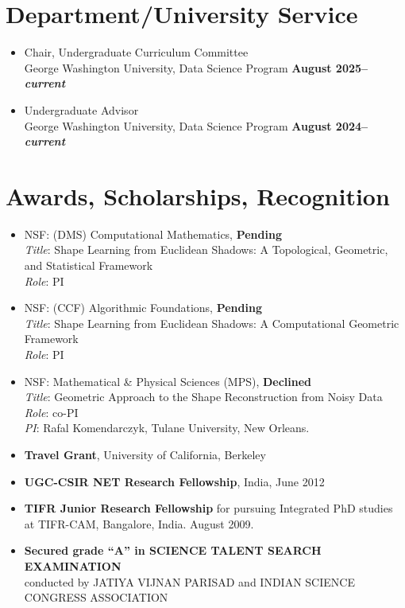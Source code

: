 \documentclass[11pt]{article}
\newif\ifpublic
\begin{document}
\section{Department/University Service}
\begin{itemize}

  \item Chair, Undergraduate Curriculum Committee\\ George Washington University, Data Science Program \hfill\textbf{\footnotesize August 2025--\emph{current}}
  
  \item Undergraduate Advisor\\ George Washington University, Data Science Program \hfill\textbf{\footnotesize August 2024--\emph{current}}
\end{itemize}


\section{Awards, Scholarships, Recognition}
\begin{itemize}[leftmargin=*]
\ifpublic\else
\item NSF: (DMS) Computational Mathematics, \textbf{Pending} \\
\emph{Title}: Shape Learning from Euclidean Shadows: A Topological, Geometric, and Statistical Framework\\
\emph{Role}: PI

\item NSF: (CCF) Algorithmic Foundations, \textbf{Pending} \\
\emph{Title}: Shape Learning from Euclidean Shadows: A Computational Geometric Framework\\
\emph{Role}: PI

\item NSF: Mathematical \& Physical Sciences (MPS), \textbf{Declined} \\
\emph{Title}: Geometric Approach to the Shape Reconstruction from Noisy Data\\
\emph{Role}: co-PI \\
\emph{PI}: Rafal Komendarczyk, Tulane University, New Orleans.
\fi

\item \textbf{Travel Grant}, University of California, Berkeley
\item \textbf{UGC-CSIR NET Research Fellowship}, India, June 2012
  
\item \textbf{TIFR Junior Research Fellowship} for pursuing Integrated PhD
studies at TIFR-CAM, Bangalore, India. August 2009.
  
\item \textbf{Secured grade ``A'' in SCIENCE TALENT SEARCH EXAMINATION}\\
  conducted by JATIYA VIJNAN PARISAD and INDIAN SCIENCE
  CONGRESS ASSOCIATION
\end{itemize}
\end{document}
